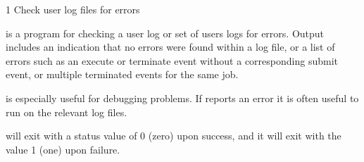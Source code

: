 \begin{ManPage}{\label{man-condor-check-userlogs}}{1}
{Check user log files for errors}
\Synopsis {}



\Description

 is a program for checking a user log or
set of users logs for errors.  
Output includes an indication that no errors were found
within a log file,
or a list of errors such as an
execute or terminate event without a corresponding submit event,
or multiple terminated events for the same job.

 is especially useful for debugging
 problems.  If  reports an error
it is often useful to run  on the relevant
log files.

\ExitStatus

 will exit with a status value of 0 (zero)
upon success, and it will exit with the value 1 (one) upon failure.

\end{ManPage}

